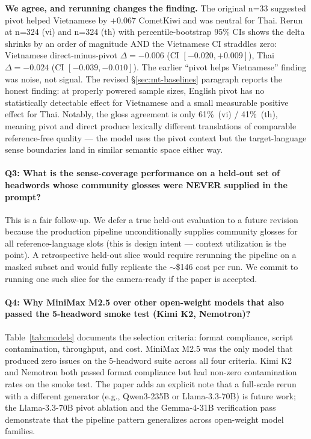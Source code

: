 \documentclass[11pt]{article}
\begin{document}
\textbf{We agree, and rerunning changes the finding.} The original n=33 suggested pivot helped Vietnamese by $+0.067$ CometKiwi and was neutral for Thai. Rerun at n=324 (vi) and n=324 (th) with percentile-bootstrap 95\% CIs shows the delta shrinks by an order of magnitude AND the Vietnamese CI straddles zero: Vietnamese direct-minus-pivot $\Delta = -0.006$ (CI $[-0.020, +0.009]$), Thai $\Delta = -0.024$ (CI $[-0.039, -0.010]$). The earlier ``pivot helps Vietnamese'' finding was noise, not signal. The revised \S\ref{sec:mt-baselines} paragraph reports the honest finding: at properly powered sample sizes, English pivot has no statistically detectable effect for Vietnamese and a small measurable positive effect for Thai. Notably, the gloss agreement is only 61\%~(vi) / 41\%~(th), meaning pivot and direct produce lexically different translations of comparable reference-free quality --- the model uses the pivot context but the target-language sense boundaries land in similar semantic space either way.

\paragraph{Q3: What is the sense-coverage performance on a held-out set of headwords whose community glosses were NEVER supplied in the prompt?}

This is a fair follow-up. We defer a true held-out evaluation to a future revision because the production pipeline unconditionally supplies community glosses for all reference-language slots (this is design intent --- context utilization is the point). A retrospective held-out slice would require rerunning the pipeline on a masked subset and would fully replicate the $\sim$\$146 cost per run. We commit to running one such slice for the camera-ready if the paper is accepted.

\paragraph{Q4: Why MiniMax M2.5 over other open-weight models that also passed the 5-headword smoke test (Kimi K2, Nemotron)?}

Table~\ref{tab:models} documents the selection criteria: format compliance, script contamination, throughput, and cost. MiniMax M2.5 was the only model that produced zero issues on the 5-headword suite across all four criteria. Kimi K2 and Nemotron both passed format compliance but had non-zero contamination rates on the smoke test. The paper adds an explicit note that a full-scale rerun with a different generator (e.g., Qwen3-235B or Llama-3.3-70B) is future work; the Llama-3.3-70B pivot ablation and the Gemma-4-31B verification pass demonstrate that the pipeline pattern generalizes across open-weight model families.
\end{document}
